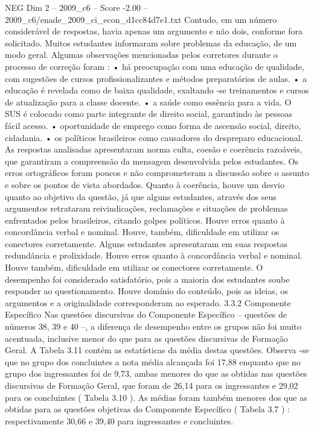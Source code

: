 \begin{textsample}{NEG Dim 2 – 2009\_c6 – Score -2.00 – 2009\_c6/enade\_2009\_ci\_econ\_d1cc84d7e1.txt}
Contudo, em um número considerável de respostas, havia apenas um argumento e não dois, conforme fora solicitado.
Muitos estudantes informaram sobre problemas da educação, de um modo geral.
Algumas observações mencionadas pelos corretores durante o processo de correção foram : • há preocupação com uma educação de qualidade, com sugestões de cursos profissionalizantes e métodos preparatórios de aulas. • a educação é revelada como de baixa qualidade, exaltando -se treinamentos e cursos de atualização para a classe docente. • a saúde como essência para a vida.
O SUS é colocado como parte integrante de direito social, garantindo às pessoas fácil acesso. • oportunidade de emprego como forma de ascensão social, direito, cidadania. • os políticos brasileiros como causadores do despreparo educacional.
As respostas analisadas apresentaram norma culta, coesão e coerência razoáveis, que garantiram a compreensão da mensagem desenvolvida pelos estudantes.
Os erros ortográficos foram poucos e não comprometeram a discussão sobre o assunto e sobre os pontos de vista abordados.
Quanto à coerência, houve um desvio quanto ao objetivo da questão, já que alguns estudantes, através dos seus argumentos retrataram reivindicações, reclamações e situações de problemas enfrentados pelos brasileiros, citando golpes políticos.
Houve erros quanto à concordância verbal e nominal.
Houve, também, dificuldade em utilizar os conectores corretamente.
Alguns estudantes apresentaram em suas respostas redundância e prolixidade.
Houve erros quanto à concordância verbal e nominal.
Houve também, dificuldade em utilizar os conectores corretamente.
O desempenho foi considerado satisfatório, pois a maioria dos estudantes soube responder ao questionamento.
Houve domínio do conteúdo, pois as ideias, os argumentos e a originalidade corresponderam ao esperado. 3.3.2 Componente Específico Nas questões discursivas do Componente Específico – questões de números 38, 39 e 40 –, a diferença de desempenho entre os grupos não foi muito acentuada, inclusive menor do que para as questões discursivas de Formação Geral.
A Tabela 3.11 contém as estatísticas da média destas questões.
Observa -se que no grupo dos concluintes a nota média alcançada foi 17,88 enquanto que no grupo dos ingressantes foi de 9,73, ambas menores do que as obtidas nas questões discursivas de Formação Geral, que foram de 26,14 para os ingressantes e 29,02 para os concluintes ( Tabela 3.10 ).
As médias foram também menores dos que as obtidas para as questões objetivas do Componente Específico ( Tabela 3.7 ) : respectivamente 30,66 e 39,40 para ingressantes e concluintes.

\end{textsample}
